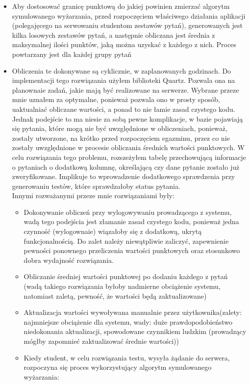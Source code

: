 \documentclass[a4paper, titlepage]{article}
\begin{document}
	\begin{itemize}
	\item Aby dostosować granicę punktową do jakiej powinien zmierzać algorytm symulowanego wyżarzania, przed rozpoczęciem właściwego działania aplikacji (polegajęcego na serwowaniu studentom zestawów pytań), generowanych jest kilka losowych zestawów pytań, a następnie obliczana jest średnia z maksymalnej ilości punktów, jaką można uzyskać z każdego z nich. Proces powtarzany jest dla każdej grupy pytań
	\item Obliczenia te dokonywane są cyklicznie, w zaplanowanych godzinach. Do implementacji tego rozwiązania użyłem biblioteki Quartz. Pozwala ona na planownaie zadań, jakie mają być realizowane na serwerze. Wybrane przeze mnie uznałem za optymalne, ponieważ pozwala ono w prosty sposób, uaktualniać obliczane wartości, a ponad to nie łamie zasad czystego kodu. Jednak podejście to ma niesie za sobą pewne komplikacje, w bazie pojawiają się pytania, które mogą nie być uwzględnione w obliczeniach, ponieważ, zostały utworzone, na krótko przed rozpoczęciem egazminu, przez co nie zostały uwzględnione w procesie obliczania średnich wartości punktowych. W celu rozwiązania tego problemu, rozszeżyłem tabelę przechowującą informacje o pytaniach o dodatkową kolumnę, określającą czy dane pytanie zostało już zweryfikowane. Implikuje to wprowadzenie dodatkowego sprawdzenia przy generowaniu testów, które sprawdzałoby status pytania. 
	\\Innymi rozważanymi przeze mnie rozwiązaniami były:
	\begin{itemize}
	\item Dokonywanie obliczeń przy wylogowywaniu prowadzącego z systemu, wadą tego podejścia jest złamanie zasad czystego kodu, ponieważ jedna czynność (wylogownaie) wiązałoby się z dodatkową, ukrytą funkcjonalnością. Do zalet należy niewątpliwie zaliczyć, zapewnienie pewności ponownego przeliczenia wartości punktowych oraz stosunkowo dobra wydajność rozwiązania. 
	\item Obliczanie średniej wartości punktowej po dodaniu każdego z pytań (wadą takiego rozwiązania byłoby nadmierne obciążenie systemu, natomiast zaletą, pewność, że wartości będą zaktualizowane)
\item Aktualizacja wartości wywoływana manualnie przez użytkownika(zalety: najmniejsze obciążenie dla systemu, wady: duże prawdopodobieństwo niedokonania aktualizacji, spowodowane czynnikiem ludzkim (prowadzący mógłby zapomnieć zaktualizować średnie wartości))
	\item Kiedy student, w celu rozwiązania testu, wysyła żądanie do serwera, rozpoczyna się proces wykorzystujący algorytm symulowanego wyżarzania:

\end{itemize}
\end{itemize}
\end{document}
